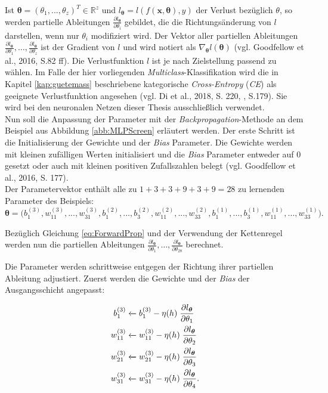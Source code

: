 \documentclass[a4paper,11pt]{article}
\begin{document}
Ist $\bm{\theta} = (\theta_1, ..., \theta_z)^T \in \mathbb{R}^z$ und $l_{\bm{\theta}} = l (f(\bm{x}, \bm{\theta}), y)$ der Verlust bezüglich $\theta$, so werden partielle Ableitungen $\frac{\partial l_{\bm{\theta}}}{\partial \theta_i} $ gebildet, die die Richtungsänderung von $l$ darstellen, wenn nur $\theta_i$ modifiziert wird. Der Vektor aller partiellen Ableitungen $\frac{\partial l_{\bm{\theta}}}{\partial \theta_1} , \dots, \frac{\partial l_{\bm{\theta}}}{\partial \theta_z} $ ist der Gradient von $l$ und wird notiert als $\nabla_{\bm{\theta}} l(\bm{\theta})$ (vgl. Goodfellow et al., 2016, S.82 ff). Die Verlustfunktion $l$ ist je nach Zielstellung passend zu wählen. Im Falle der hier vorliegenden \textit{Multiclass}-Klassifikation wird die in Kapitel \ref{kap:guetemass} beschriebene kategorische \textit{Cross-Entropy} (\textit{CE}) als geeignete Verlustfunktion angesehen (vgl. Di et al., 2018, S. 220, \cite{keras}, S.179). Sie wird bei den neuronalen Netzen dieser Thesis ausschließlich verwendet.\\

Nun soll die Anpassung der Parameter mit der \textit{Backpropagation}-Methode an dem Beispiel aus Abbildung \ref{abb:MLPScreen} erläutert werden.
Der erste Schritt ist die Initialisierung der Gewichte und der \textit{Bias} Parameter. Die Gewichte werden mit kleinen zufälligen Werten initialisiert und die \textit{Bias} Parameter entweder auf $0$ gesetzt oder auch mit kleinen positiven Zufallszahlen belegt (vgl. Goodfellow et al., 2016, S. 177). \\
Der Parametervektor enthält alle zu $1+3+3+9+3+9 = 28$ zu lernenden Parameter des Beispiels:
\[ \bm{\theta} = \bigl( b_1^{(3)}, w_{11}^{(3)}, ...,w_{31}^{(3)}, b_1^{(2)}, ..., b_3^{(2)},
w_{11}^{(2)}, ...,w_{33}^{(2)}, b_1^{(1)}, ..., b_3^{(1)},  
w_{11}^{(1)}, ...,w_{33}^{(1)} \bigr).
\]

Bezüglich Gleichung \ref{eq:ForwardProp} und der Verwendung der Kettenregel werden nun die partiellen Ableitungen $\frac{\partial l_{\bm{\theta}}}{\partial \theta_1} , \dots, \frac{\partial l_{\bm{\theta}}}{\partial \theta_{28}} $ berechnet.  

Die Parameter werden schrittweise entgegen der Richtung ihrer partiellen Ableitung adjustiert. Zuerst werden die Gewichte und der \textit{Bias} der Ausgangsschicht angepasst:

\begin{align*}
     b_1^{(3)} &\xleftarrow{}  b_1^{(3)} - \eta(h) \hspace{0.1cm} \frac{\partial l_{\bm{\theta}}}{\partial \theta_1} \\
      w_{11}^{(3)} &\xleftarrow{} w_{11}^{(3)} - \eta(h) \hspace{0.1cm} \frac{\partial l_{\bm{\theta}}}{\partial \theta_2} \\
     w_{21}^{(3)} &\xleftarrow{} w_{21}^{(3)} - \eta(h) \hspace{0.1cm} \frac{\partial l_{\bm{\theta}}}{\partial \theta_3} \\
     w_{31}^{(3)} &\xleftarrow{} w_{31}^{(3)} - \eta(h) \hspace{0.1cm} \frac{\partial l_{\bm{\theta}}}{\partial \theta_4} .
\end{align*}
  
\end{document}
